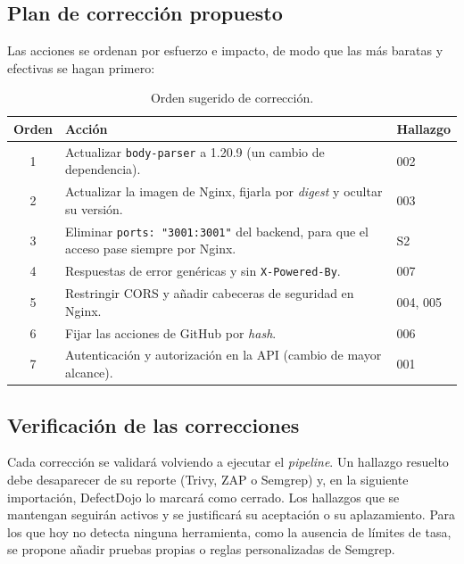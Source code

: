 \subsection{Plan de corrección propuesto}

Las acciones se ordenan por esfuerzo e impacto, de modo que las más baratas
y efectivas se hagan primero:

\begin{table}[H]
\centering
\caption{Orden sugerido de corrección.}
\label{tab:plan-correccion}

\begin{tabularx}{\textwidth}{c X l}
\toprule
\textbf{Orden} &
\textbf{Acción} &
\textbf{Hallazgo} \\
\midrule
1 & Actualizar \texttt{body-parser} a 1.20.9 (un cambio de dependencia). &
002 \\

2 & Actualizar la imagen de Nginx, fijarla por \textit{digest} y ocultar su
versión. & 003 \\

3 & Eliminar \texttt{ports: "3001:3001"} del backend, para que el acceso pase
siempre por Nginx. & S2 \\

4 & Respuestas de error genéricas y sin \texttt{X-Powered-By}. & 007 \\

5 & Restringir CORS y añadir cabeceras de seguridad en Nginx. & 004, 005 \\

6 & Fijar las acciones de GitHub por \textit{hash}. & 006 \\

7 & Autenticación y autorización en la API (cambio de mayor alcance). &
001 \\
\bottomrule
\end{tabularx}
\end{table}

\subsection{Verificación de las correcciones}

Cada corrección se validará volviendo a ejecutar el \textit{pipeline}. Un
hallazgo resuelto debe desaparecer de su reporte (Trivy, ZAP o Semgrep) y, en
la siguiente importación, DefectDojo lo marcará como cerrado. Los hallazgos
que se mantengan seguirán activos y se justificará su aceptación o su
aplazamiento. Para los que hoy no detecta ninguna herramienta, como la
ausencia de límites de tasa, se propone añadir pruebas propias o reglas
personalizadas de Semgrep.
